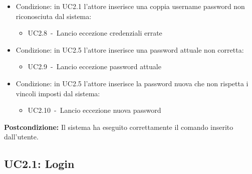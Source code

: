 \documentclass{scalatekids-article}
\begin{document}
\begin{itemize}
\item Condizione: in UC2.1 l'attore inserisce una coppia username password non riconosciuta dal sistema:
  \begin{itemize}
  \item UC2.8\ -\ Lancio eccezione credenziali errate
  \end{itemize}
\item Condizione: in UC2.5 l'attore inserisce una password attuale non corretta:
  \begin{itemize}
  \item UC2.9\ -\ Lancio eccezione password attuale
  \end{itemize}
\item Condizione: in UC2.5 l'attore inserisce la password nuova che non rispetta i vincoli imposti dal sistema: %
  \begin{itemize}
  \item UC2.10\ -\ Lancio eccezione nuova password
  \end{itemize}
\end{itemize}
\textbf{Postcondizione:} Il sistema ha eseguito correttamente il comando inserito dall'utente.

\subsection{UC2.1: Login}
\end{document}
